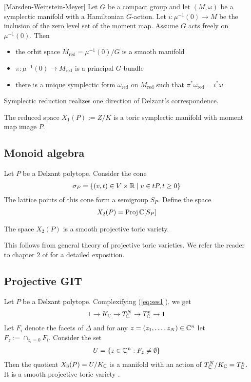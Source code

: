 \begin{theorem}{\label{thm:reduction}}
    [Marsden-Weinstein-Meyer] Let $G$ be a compact group and let $(M,\omega)$ be a symplectic manifold with a
    Hamiltonian $G$-action. Let $i:\mu^{-1}(0)\to M$ be the inclusion of the zero level set of the moment map.
    Assume $G$ acts freely on $\mu^{-1}(0)$. Then \begin{itemize}
        \item the orbit space $M_{\text{red}} = \mu^{-1}(0)/G$ is a smooth manifold
        \item $\pi:\mu^{-1}(0)\to M_{\text{red}}$ is a principal $G$-bundle
        \item there is a unique symplectic form $\omega_{\text{red}}$ on $M_{\text{red}}$ such that $\pi^*\omega_{\text{red}} = i^*\omega$
    \end{itemize}
\end{theorem}
Symplectic reduction realizes one direction of Delzant's correspondence.
\begin{proposition}
    The reduced space $X_1(P) := Z/K$ is a toric symplectic manifold with moment map image $P$.
\end{proposition}

\subsection{Monoid algebra}
Let $P$ be a Delzant polytope. Consider the cone \begin{align*}
    \sigma_P = \{ (v,t) \in V \times \mathbb{R} \mid v \in tP, t \geq 0 \}
\end{align*} The lattice points of this cone 
form a semigroup $S_P$. Define the space \begin{align*}
    X_2(P) = \operatorname{Proj} \mathbb{C}[S_P]
\end{align*} 

\begin{proposition}
    The space $X_2(P)$ is a smooth projective toric variety.
\end{proposition}
This follows from general theory of projective toric varieties. We 
refer the reader to chapter 2 of \cite{cls} for a detailed exposition.

\subsection{Projective GIT}
Let $P$ be a Delzant polytope. Complexifying (\ref{eq:ses1}), we get \begin{align*}
    1\to K_{\mathbb{C}} \to T_{\mathbb{C}}^N \to T_{\mathbb{C}}^n \to 1 
\end{align*} Let $F_i$ denote the facets of $\Delta$ and for any $z = (z_1,\dots,z_N)\in\mathbb{C}^n$ let $F_z := \cap_{z_i = 0}F_i$.
Consider the set \begin{align*}
    U = \{z\in\mathbb{C}^n: F_z \neq \emptyset\}
\end{align*} Then the quotient $X_3(P) = U/K_{\mathbb{C}}$ is a manifold with an action of $T_{\mathbb{C}}^N/K_{\mathbb{C}} = T_{\mathbb{C}}^n$. It 
is a smooth projective toric variety .

